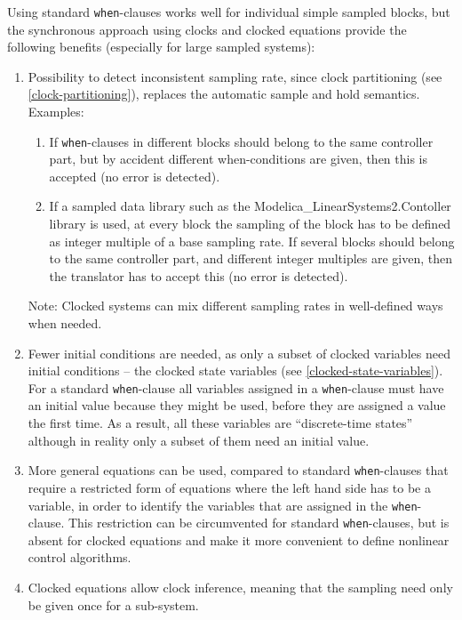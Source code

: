\begin{nonnormative}
Using standard \lstinline!when!-clauses works well for individual simple sampled blocks, but the synchronous approach using clocks and clocked equations provide the following benefits (especially for large sampled systems):
\begin{enumerate}
\item
  Possibility to detect inconsistent sampling rate, since clock partitioning (see \cref{clock-partitioning}),
  replaces the automatic sample and hold semantics. Examples:
  \begin{enumerate}
  \def\labelenumii{\alph{enumii}.}
  \item
    If \lstinline!when!-clauses in different blocks should belong to the same
    controller part, but by accident different when-conditions are
    given, then this is accepted (no error is detected).
  \item
    If a sampled data library such as the
    Modelica\_LinearSystems2.Contoller library is used, at every block
    the sampling of the block has to be defined as integer multiple of a
    base sampling rate. If several blocks should belong to the same
    controller part, and different integer multiples are given, then the
    translator has to accept this (no error is detected).
  \end{enumerate}
  Note: Clocked systems can mix different sampling rates
  in well-defined ways when needed.
\item
  Fewer initial conditions are needed, as only a subset of clocked
  variables need initial conditions -- the clocked state variables (see \cref{clocked-state-variables}).
  For a standard \lstinline!when!-clause all variables
  assigned in a \lstinline!when!-clause must have an initial value
  because they might be used, before they are assigned a value the first
  time. As a result, all these variables are ``discrete-time states''
  although in reality only a subset of them need an initial
  value.
\item
  More general equations can be used, compared to standard \lstinline!when!-clauses that require
  a restricted form of equations where the left hand side has to be a variable, in order
  to identify the variables that are assigned in the \lstinline!when!-clause.
  This restriction can be circumvented for standard \lstinline!when!-clauses, but is
  absent for clocked equations and make it more convenient to define
  nonlinear control algorithms.
\item
  Clocked equations allow clock inference,
  meaning that the sampling need only be given once for a sub-system.

\end{enumerate}
\end{nonnormative}
